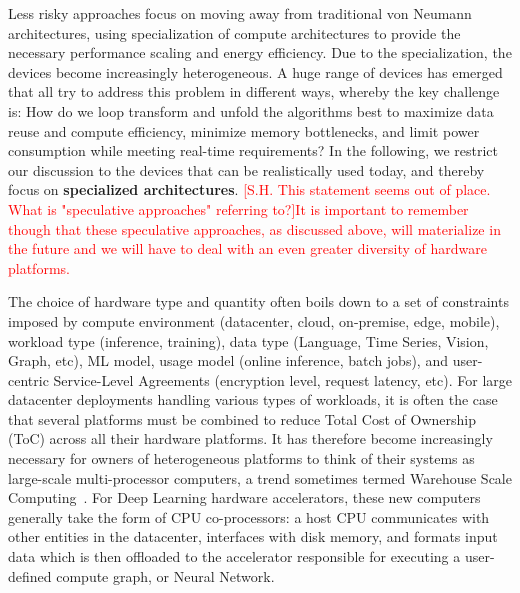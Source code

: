

Less risky approaches focus on moving away from traditional von Neumann architectures, using specialization of compute architectures to provide the necessary performance scaling and energy efficiency. 
Due to the specialization, the devices become increasingly heterogeneous.
A huge range of devices has emerged that all try to address this problem in different ways, whereby the key challenge is:
How do we loop transform and unfold the algorithms best to maximize data reuse and compute efficiency, minimize memory bottlenecks, and limit power consumption while meeting real-time requirements? 
In the following, we restrict our discussion to the devices that can be realistically used today, and thereby focus on \textbf{specialized architectures}. 
\textcolor{red}{[S.H. This statement seems out of place.  What is "speculative approaches" referring to?]It is important to remember though that these speculative approaches, as discussed above, will materialize in the future and we will have to deal with an even greater diversity of hardware platforms.}

The choice of hardware type and quantity often boils down to a set of constraints imposed by compute environment (datacenter, cloud, on-premise, edge, mobile), workload type (inference, training), data type (Language, Time Series, Vision, Graph, etc), ML model, usage model (online inference, batch jobs), and user-centric Service-Level Agreements (encryption level, request latency, etc). For large datacenter deployments handling various types of workloads, it is often the case that several platforms must be combined to reduce Total Cost of Ownership (ToC) across all their hardware platforms. It has therefore become increasingly necessary for owners of heterogeneous platforms to think of their systems as large-scale multi-processor computers, a trend sometimes termed Warehouse Scale Computing~\cite{wsc}. For Deep Learning hardware accelerators, these new computers generally take the form of CPU co-processors: a host CPU communicates with other entities in the datacenter, interfaces with disk memory, and formats input data which is then offloaded to the accelerator responsible for executing a user-defined compute graph, or Neural Network. 


